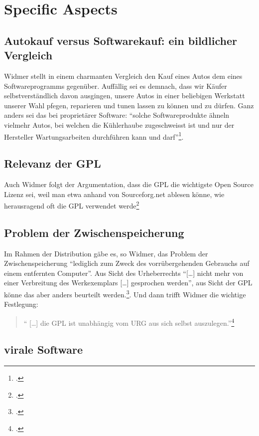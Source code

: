 \documentclass[DIV=calc,BCOR=5mm,11pt,headings=small,oneside,abstract=true, toc=bib]{scrartcl}
\begin{document}
\section{Specific Aspects}

\subsection{Autokauf versus Softwarekauf: ein bildlicher Vergleich}

Widmer stellt in einem charmanten Vergleich den Kauf eines Autos dem eines
Softwareprogramms gegenüber. Auffällig sei es demnach, dass wir Käufer
selbstverständlich davon ausgingen, unsere Autos in einer beliebigen Werkstatt
unserer Wahl pfegen, reparieren und tunen lassen zu können und zu dürfen. Ganz
anders sei das bei proprietärer Software: \enquote{solche Softwareprodukte
ähneln vielmehr Autos, bei welchen die Kühlerhaube zugeschweisst ist und
nur der Hersteller Wartungsarbeiten durchführen kann und
darf}\footcite[vgl.][1]{Widmer2003a}.

\subsection{Relevanz der GPL}
Auch Widmer folgt der Argumentation, dass die GPL die wichtigste Open Source
Lizenz sei, weil man etwa anhand von Sourceforg.net ablesen könne, wie
herausragend oft die GPL verwendet werde\footcite[vgl.][102]{Widmer2003a}

\subsection{Problem der Zwischenspeicherung}
Im Rahmen der Distribution gäbe es, so Widmer, das Problem der
Zwischenspeicherung \enquote{lediglich zum Zweck des vorrübergehenden
Gebrauchs auf einem entfernten Computer}.
Aus Sicht des Urheberrechts \enquote{[\ldots] nicht mehr von einer
Verbreitung des Werkexemplars [\ldots] gesprochen werden}, aus Sicht der
GPL könne das aber anders beurteilt werden.\footcite[vgl.][119]{Widmer2003a}.
Und dann trifft Widmer die wichtige Festlegung:
\begin{quote} \enquote{ [\ldots] die GPL ist unabhängig vom URG aus sich
selbst auszulegen.}\footcite[][119]{Widmer2003a}
\end{quote}

\subsection{virale Software}
\end{document}
